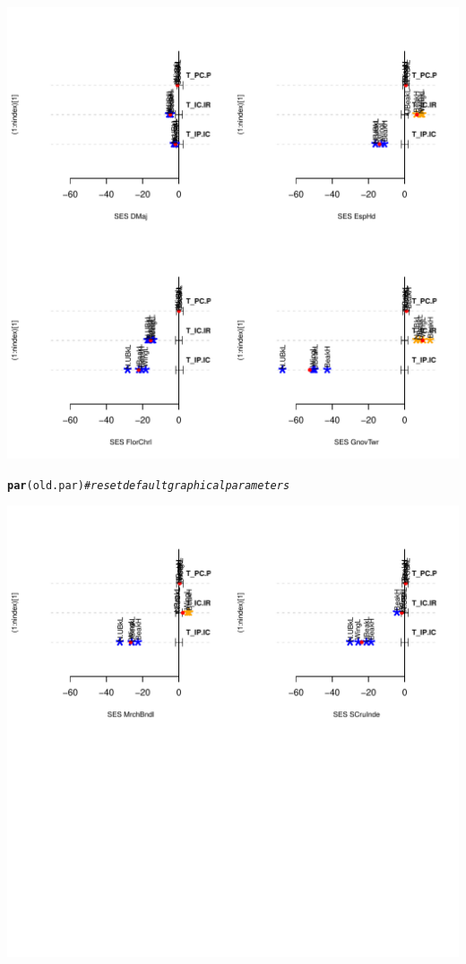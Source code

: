 \documentclass[12pt]{article}\usepackage[]{graphicx}\usepackage[]{color}
\makeatletter
\def\maxwidth{ %
  \ifdim\Gin@nat@width>\linewidth
    \linewidth
  \else
    \Gin@nat@width
  \fi
}
\newcommand{\hlcom}[1]{\textcolor[rgb]{0.678,0.584,0.686}{\textit{#1}}}%
\newcommand{\hlstd}[1]{\textcolor[rgb]{0.345,0.345,0.345}{#1}}%
\newcommand{\hlkwd}[1]{\textcolor[rgb]{0.737,0.353,0.396}{\textbf{#1}}}%
\newenvironment{kframe}{%
 \def\at@end@of@kframe{}%
 \ifinner\ifhmode%
  \def\at@end@of@kframe{\end{minipage}}%
  \begin{minipage}{\columnwidth}%
 \fi\fi%
 \def\FrameCommand##1{\hskip\@totalleftmargin \hskip-\fboxsep
 \colorbox{shadecolor}{##1}\hskip-\fboxsep
     \hskip-\linewidth \hskip-\@totalleftmargin \hskip\columnwidth}%
 \MakeFramed {\advance\hsize-\width
   \@totalleftmargin\z@ \linewidth\hsize
   \@setminipage}}%
 {\par\unskip\endMakeFramed%
 \at@end@of@kframe}
\newenvironment{knitrout}{}{} %
\makeatother
\begin{document}
\begin{knitrout}
{\centering \includegraphics[width=\maxwidth]{figure/unnamed-chunk-36-2} 

}


\begin{kframe}\begin{alltt}
\hlkwd{par}\hlstd{(old.par)} \hlcom{# reset default graphical parameters}
\end{alltt}
\end{kframe}

{\centering \includegraphics[width=\maxwidth]{figure/unnamed-chunk-36-3} 

}



\end{knitrout}
\end{document}
